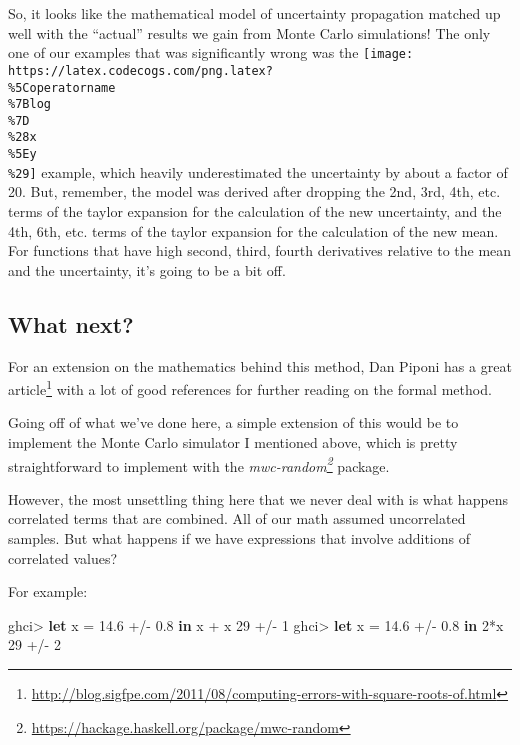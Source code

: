 \documentclass[]{article}
\newenvironment{Shaded}{}{}
\newcommand{\KeywordTok}[1]{\textcolor[rgb]{0.00,0.44,0.13}{\textbf{#1}}}
\newcommand{\DecValTok}[1]{\textcolor[rgb]{0.25,0.63,0.44}{#1}}
\newcommand{\FloatTok}[1]{\textcolor[rgb]{0.25,0.63,0.44}{#1}}
\newcommand{\FunctionTok}[1]{\textcolor[rgb]{0.02,0.16,0.49}{#1}}
\newcommand{\NormalTok}[1]{#1}
\renewcommand{\href}[2]{#2\footnote{\url{#1}}}
\begin{document}
So, it looks like the mathematical model of uncertainty propagation matched up
well with the ``actual'' results we gain from Monte Carlo simulations! The only
one of our examples that was significantly wrong was the
\texttt{[image: https://latex.codecogs.com/png.latex?\\\%5Coperatorname\\\%7Blog\\\%7D\\\%28x\\\%5Ey\\\%29]}
example, which heavily underestimated the uncertainty by about a factor of 20.
But, remember, the model was derived after dropping the 2nd, 3rd, 4th, etc.
terms of the taylor expansion for the calculation of the new uncertainty, and
the 4th, 6th, etc. terms of the taylor expansion for the calculation of the new
mean. For functions that have high second, third, fourth derivatives relative to
the mean and the uncertainty, it's going to be a bit off.

\subsection{What next?}\label{what-next}

For an extension on the mathematics behind this method, Dan Piponi has a
\href{http://blog.sigfpe.com/2011/08/computing-errors-with-square-roots-of.html}{great
article} with a lot of good references for further reading on the formal method.

Going off of what we've done here, a simple extension of this would be to
implement the Monte Carlo simulator I mentioned above, which is pretty
straightforward to implement with the
\emph{\href{https://hackage.haskell.org/package/mwc-random}{mwc-random}}
package.

However, the most unsettling thing here that we never deal with is what happens
correlated terms that are combined. All of our math assumed uncorrelated
samples. But what happens if we have expressions that involve additions of
correlated values?

For example:

\begin{Shaded}
\begin{Highlighting}[]
\NormalTok{ghci}\FunctionTok{>} \KeywordTok{let}\NormalTok{ x }\FunctionTok{=} \FloatTok{14.6} \FunctionTok{+/-} \FloatTok{0.8} \KeywordTok{in}\NormalTok{ x }\FunctionTok{+}\NormalTok{ x}
\DecValTok{29} \FunctionTok{+/-} \DecValTok{1}
\NormalTok{ghci}\FunctionTok{>} \KeywordTok{let}\NormalTok{ x }\FunctionTok{=} \FloatTok{14.6} \FunctionTok{+/-} \FloatTok{0.8} \KeywordTok{in} \DecValTok{2}\FunctionTok{*}\NormalTok{x}
\DecValTok{29} \FunctionTok{+/-} \DecValTok{2}
\end{Highlighting}
\end{Shaded}
\end{document}
